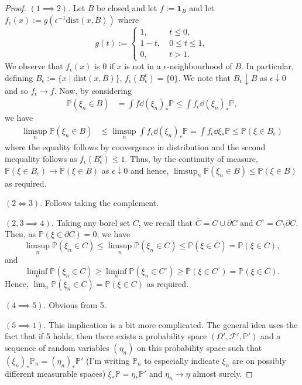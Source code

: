 \documentclass[]{article}
\theoremstyle{definition}
\theoremstyle{definition}
\begin{document}
\begin{proof}
  \((1 \implies 2)\). Let \(B\) be closed and let \(f := \mathbf{1}_B\) and let 
  \(f_\epsilon(x) := g(\epsilon^{-1} \text{dist}(x, B))\) where 
  \[g(t) := \begin{cases}
    1, \ & t\le 0,\\
    1 - t, \ & 0 \le t \le 1,\\
    0, \ & t > 1.
  \end{cases}\]
  We observe that \(f_\epsilon(x)\) is 0 if \(x\) is not in a \(\epsilon\)-neighbourhood
  of \(B\). In particular, defining \(B_\epsilon := \{x \mid \text{dist}(x, B)\}\), 
  \(f_\epsilon(B_\epsilon^c) = \{0\}\). We note that \(B_\epsilon \downarrow B\) 
  as \(\epsilon \downarrow 0\) and so \(f_\epsilon \to f\). Now, by considering
  \[\begin{split}
    \mathbb{P}(\xi_n \in B) & = \int f \dd (\xi_n)_*\mathbb{P}
      \le \int f_\epsilon \dd (\xi_n)_*\mathbb{P},
  \end{split}\]
  we have 
  \[\begin{split}
    \limsup_n \mathbb{P}(\xi_n \in B) 
    & \le \limsup_n \int f_\epsilon \dd (\xi_n)_*\mathbb{P} 
      = \int f_\epsilon \dd \xi_*\mathbb{P} \le \mathbb{P}(\xi \in B_\epsilon)
  \end{split}\]
  where the equality follows by convergence in distribution and the second 
  inequality follows as \(f_\epsilon(B_\epsilon^c) \le 1\). Thus, by the continuity 
  of measure, \(\mathbb{P}(\xi \in B_\epsilon) \to \mathbb{P}(\xi \in B)\) as 
  \(\epsilon \downarrow 0\) and hence, 
  \(\limsup_n \mathbb{P}(\xi_n \in B) \le \mathbb{P}(\xi \in B)\) as required.

  \((2 \iff 3)\). Follows taking the complement. 

  \((2, 3 \implies 4)\). Taking any borel set \(C\), we recall that 
  \(\overline{C} = C \cup \partial C\) and \(C^\circ = C \setminus \partial C\).
  Then, as \(\mathbb{P}(\xi \in \partial C) = 0\), we have 
  \[\limsup_n \mathbb{P}(\xi_n \in C) \le \limsup_n \mathbb{P}(\xi_n \in \overline{C}) 
    \le \mathbb{P}(\xi \in \overline{C}) = \mathbb{P}(\xi \in C),\]
  and 
  \[\liminf_n \mathbb{P}(\xi_n \in C) \ge \liminf_n \mathbb{P}(\xi_n \in C^\circ) 
    \ge \mathbb{P}(\xi \in C^\circ) = \mathbb{P}(\xi \in C).\]
  Hence, \(\lim_n \mathbb{P}(\xi_n \in C) = \mathbb{P}(\xi \in C)\) as required.

  \((4 \implies 5)\). Obvious from 5.

  \((5 \implies 1)\). This implication is a bit more complicated. The general idea 
  uses the fact that if 5 holds, then there exists a probability space 
  \((\Omega', \mathcal{F}', \mathbb{P}')\) and a sequence of random variables 
  \((\eta_n)\) on this probability space such that 
  \((\xi_n)_*\mathbb{P}_n = (\eta_n)_*\mathbb{P}'\) (I'm writing 
  \(\mathbb{P}_n\) to especially indicate \(\xi_n\) are on possibly different 
  measurable spaces) \(\xi_*\mathbb{P} = \eta_* \mathbb{P}'\) and \(\eta_n \to \eta\) 
  almost surely.


\end{proof}
\end{document}
